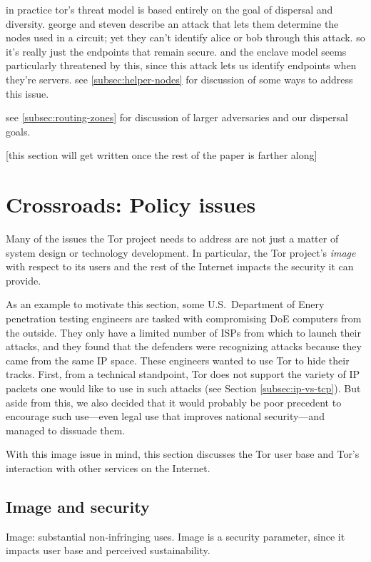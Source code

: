 \documentclass{llncs}
\begin{document}
in practice tor's threat model is based entirely on the goal of dispersal
and diversity. george and steven describe an attack \cite{draft} that
lets them determine the nodes used in a circuit; yet they can't identify
alice or bob through this attack. so it's really just the endpoints that
remain secure. and the enclave model seems particularly threatened by
this, since this attack lets us identify endpoints when they're servers.
see \ref{subsec:helper-nodes} for discussion of some ways to address this
issue.

see \ref{subsec:routing-zones} for discussion of larger
adversaries and our dispersal goals.

[this section will get written once the rest of the paper is farther along]

\section{Crossroads: Policy issues}
\label{sec:crossroads-policy}

Many of the issues the Tor project needs to address are not just a
matter of system design or technology development. In particular, the
Tor project's \emph{image} with respect to its users and the rest of
the Internet impacts the security it can provide.

As an example to motivate this section, some U.S.~Department of Enery
penetration testing engineers are tasked with compromising DoE computers
from the outside. They only have a limited number of ISPs from which to
launch their attacks, and they found that the defenders were recognizing
attacks because they came from the same IP space. These engineers wanted
to use Tor to hide their tracks. First, from a technical standpoint,
Tor does not support the variety of IP packets one would like to use in
such attacks (see Section \ref{subsec:ip-vs-tcp}). But aside from this,
we also decided that it would probably be poor precedent to encourage
such use---even legal use that improves national security---and managed
to dissuade them.

With this image issue in mind, this section discusses the Tor user base and
Tor's interaction with other services on the Internet.

\subsection{Image and security}

Image: substantial non-infringing uses. Image is a security parameter,
since it impacts user base and perceived sustainability.
\end{document}
